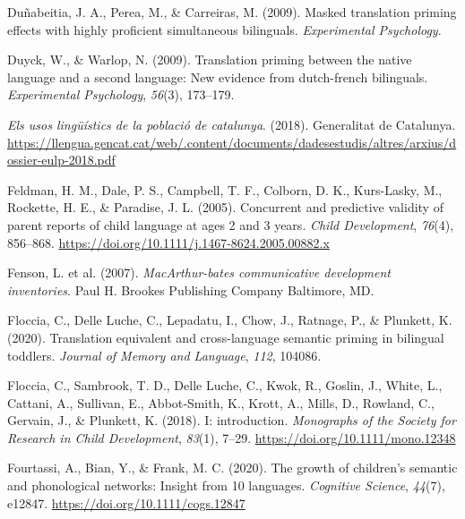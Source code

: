 \documentclass[
]{article}
\newlength{\cslhangindent}
\newlength{\cslentryspacingunit} %
\newenvironment{CSLReferences}[2] %
 {%
  \setlength{\parindent}{0pt}
  \ifodd #1
  \let\oldpar\par
  \def\par{\hangindent=\cslhangindent\oldpar}
  \fi
  \setlength{\parskip}{#2\cslentryspacingunit}
 }%
 {}
\begin{document}
\begin{CSLReferences}{1}{0}
\leavevmode{}%
Duñabeitia, J. A., Perea, M., \& Carreiras, M. (2009). Masked
translation priming effects with highly proficient simultaneous
bilinguals. \emph{Experimental Psychology}.

\leavevmode{}%
Duyck, W., \& Warlop, N. (2009). Translation priming between the native
language and a second language: New evidence from dutch-french
bilinguals. \emph{Experimental Psychology}, \emph{56}(3), 173--179.

\leavevmode{}%
\emph{Els usos lingüístics de la població de catalunya}. (2018).
Generalitat de Catalunya.
\url{https://llengua.gencat.cat/web/.content/documents/dadesestudis/altres/arxius/dossier-eulp-2018.pdf}

\leavevmode{}%
Feldman, H. M., Dale, P. S., Campbell, T. F., Colborn, D. K.,
Kurs-Lasky, M., Rockette, H. E., \& Paradise, J. L. (2005). Concurrent
and predictive validity of parent reports of child language at ages 2
and 3 years. \emph{Child Development}, \emph{76}(4), 856--868.
\url{https://doi.org/10.1111/j.1467-8624.2005.00882.x}

\leavevmode{}%
Fenson, L. et al. (2007). \emph{{MacArthur}-bates communicative
development inventories}. Paul H. Brookes Publishing Company Baltimore,
{MD}.

\leavevmode{}%
Floccia, C., Delle Luche, C., Lepadatu, I., Chow, J., Ratnage, P., \&
Plunkett, K. (2020). Translation equivalent and cross-language semantic
priming in bilingual toddlers. \emph{Journal of Memory and Language},
\emph{112}, 104086.

\leavevmode{}%
Floccia, C., Sambrook, T. D., Delle Luche, C., Kwok, R., Goslin, J.,
White, L., Cattani, A., Sullivan, E., Abbot‐Smith, K., Krott, A., Mills,
D., Rowland, C., Gervain, J., \& Plunkett, K. (2018). I: introduction.
\emph{Monographs of the Society for Research in Child Development},
\emph{83}(1), 7--29. \url{https://doi.org/10.1111/mono.12348}

\leavevmode{}%
Fourtassi, A., Bian, Y., \& Frank, M. C. (2020). The growth of
children's semantic and phonological networks: Insight from 10
languages. \emph{Cognitive Science}, \emph{44}(7), e12847.
\url{https://doi.org/10.1111/cogs.12847}


\end{CSLReferences}
\end{document}
